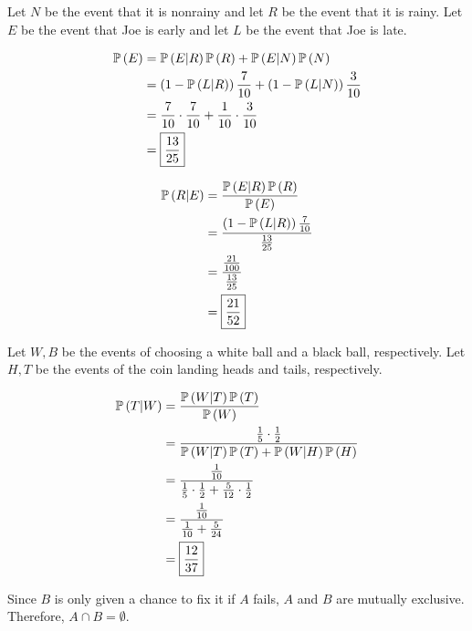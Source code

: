\documentclass{article}
\begin{document}
 
\setcounter{problem}{34}
\problem{}
Let $N$ be the event that it is nonrainy and let $R$ be the event that it is rainy.
Let $E$ be the event that Joe is early and let $L$ be the event that Joe is late.

\subproblema{}

\begin{align*}
  \mathbb{P} \left ( E \right) &= \mathbb{P} \left ( E \vert R \right) \mathbb{P} \left ( R \right) + \mathbb{P} \left ( E \vert N \right) \mathbb{P} \left ( N \right) \\
         &= \left (1 - \mathbb{P} \left ( L \vert R \right) \right) \frac{7}{10} + \left (1 - \mathbb{P} \left ( L \vert N \right) \right) \frac{3}{10} \\
         &= \frac{7}{10} \cdot \frac{7}{10} + \frac{1}{10} \cdot \frac{3}{10} \\
         &= \boxed{\frac{13}{25}} \\
\end{align*}

\subproblema{}
\begin{align*}
  \mathbb{P} \left ( R \vert E \right) &= \frac{\mathbb{P} \left ( E \vert R \right) \mathbb{P} \left ( R \right)}{\mathbb{P} \left ( E \right)} \\
                 &= \frac{\left (1 - \mathbb{P} \left ( L \vert R \right) \right) \frac{7}{10} }{\frac{13}{25}} \\
                 &= \frac{\frac{21}{100}}{\frac{13}{25}} \\
                 &= \boxed{\frac{21}{52}} \\
\end{align*}


\setcounter{problem}{39}
\problem{}

Let $W, B$ be the events of choosing a white ball and a black ball, respectively.
Let $H, T$ be the events of the coin landing heads and tails, respectively.

\begin{align*}
  \mathbb{P} \left ( T \vert W \right) &= \frac{\mathbb{P} \left ( W \vert T \right) \mathbb{P} \left ( T \right)}{\mathbb{P} \left ( W \right)} \\
                 &= \frac{\frac{1}{5} \cdot \frac{1}{2}}{\mathbb{P} \left ( W \vert T \right) \mathbb{P} \left ( T \right) + \mathbb{P} \left ( W \vert H \right) \mathbb{P} \left ( H \right)} \\
                 &= \frac{\frac{1}{10}}{\frac{1}{5} \cdot \frac{1}{2} + \frac{5}{12} \cdot \frac{1}{2}} \\
                 &= \frac{\frac{1}{10}}{\frac{1}{10} + \frac{5}{24}} \\
                 &= \boxed{\frac{12}{37}} \\
\end{align*}

\setcounter{problem}{46}
\problem{}
\subproblema{}

Since $B$ is only given a chance to fix it if $A$ fails, $A$ and $B$ are mutually exclusive.
Therefore, $A \cap B = \emptyset$.
\end{document}
